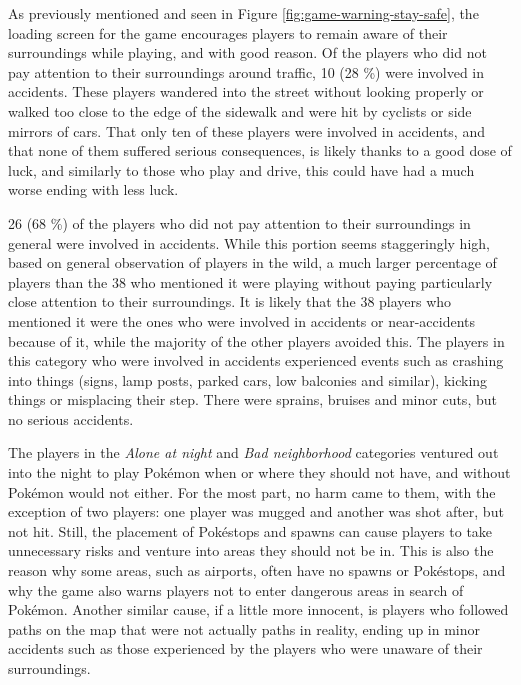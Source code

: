 As previously mentioned and seen in Figure \ref{fig:game-warning-stay-safe}, the loading screen for the game encourages players to remain aware of their surroundings while playing, and with good reason. Of the players who did not pay attention to their surroundings around traffic, 10 (28 \%) were involved in accidents. These players wandered into the street without looking properly or walked too close to the edge of the sidewalk and were hit by cyclists or side mirrors of cars. That only ten of these players were involved in accidents, and that none of them suffered serious consequences, is likely thanks to a good dose of luck, and similarly to those who play and drive, this could have had a much worse ending with less luck.

26 (68 \%) of the players who did not pay attention to their surroundings in general were involved in accidents. While this portion seems staggeringly high, based on general observation of players in the wild, a much larger percentage of players than the 38 who mentioned it were playing without paying particularly close attention to their surroundings. It is likely that the 38 players who mentioned it were the ones who were involved in accidents or near-accidents because of it, while the majority of the other players avoided this. The players in this category who were involved in accidents experienced events such as crashing into things (signs, lamp posts, parked cars, low balconies and similar), kicking things or misplacing their step. There were sprains, bruises and minor cuts, but no serious accidents.

The players in the \emph{Alone at night} and \emph{Bad neighborhood} categories ventured out into the night to play Pokémon when or where they should not have, and without Pokémon would not either. For the most part, no harm came to them, with the exception of two players: one player was mugged \cite{savannahMugging} and another was shot after, but not hit. Still, the placement of Pokéstops and spawns can cause players to take unnecessary risks and venture into areas they should not be in. This is also the reason why some areas, such as airports, often have no spawns or Pokéstops, and why the game also warns players not to enter dangerous areas in search of Pokémon. Another similar cause, if a little more innocent, is players who followed paths on the map that were not actually paths in reality, ending up in minor accidents such as those experienced by the players who were unaware of their surroundings.

